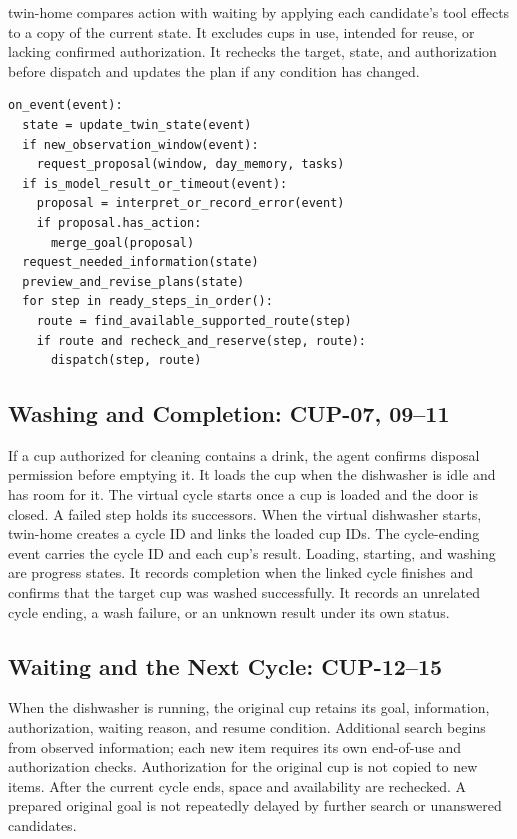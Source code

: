 \documentclass[conference,a4paper]{IEEEtran}
\begin{document}
twin-home compares action with waiting by applying each candidate's tool effects to a copy of the current state. It excludes cups in use, intended for reuse, or lacking confirmed authorization. It rechecks the target, state, and authorization before dispatch and updates the plan if any condition has changed.

\begingroup\footnotesize
\begin{verbatim}
on_event(event):
  state = update_twin_state(event)
  if new_observation_window(event):
    request_proposal(window, day_memory, tasks)
  if is_model_result_or_timeout(event):
    proposal = interpret_or_record_error(event)
    if proposal.has_action:
      merge_goal(proposal)
  request_needed_information(state)
  preview_and_revise_plans(state)
  for step in ready_steps_in_order():
    route = find_available_supported_route(step)
    if route and recheck_and_reserve(step, route):
      dispatch(step, route)
\end{verbatim}
\endgroup

\subsection{Washing and Completion: CUP-07, 09--11}

If a cup authorized for cleaning contains a drink, the agent confirms disposal permission before emptying it. It loads the cup when the dishwasher is idle and has room for it. The virtual cycle starts once a cup is loaded and the door is closed. A failed step holds its successors. When the virtual dishwasher starts, twin-home creates a cycle ID and links the loaded cup IDs. The cycle-ending event carries the cycle ID and each cup's result. Loading, starting, and washing are progress states. It records completion when the linked cycle finishes and confirms that the target cup was washed successfully. It records an unrelated cycle ending, a wash failure, or an unknown result under its own status.

\subsection{Waiting and the Next Cycle: CUP-12--15}

When the dishwasher is running, the original cup retains its goal, information, authorization, waiting reason, and resume condition. Additional search begins from observed information; each new item requires its own end-of-use and authorization checks. Authorization for the original cup is not copied to new items. After the current cycle ends, space and availability are rechecked. A prepared original goal is not repeatedly delayed by further search or unanswered candidates.
\end{document}
